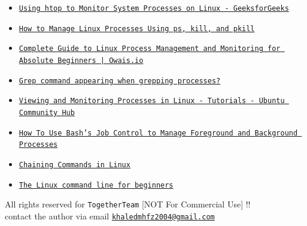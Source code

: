 \documentclass[12pt]{article}
\begin{document}
\begin{itemize}
    \item \href{https://www.geeksforgeeks.org/linux-unix/using-htop-to-monitor-system-processes-on-linux/}{\texttt{Using htop to Monitor System Processes on Linux - GeeksforGeeks}}
    \item \href{https://www.howtogeek.com/how-to-manage-linux-processes-using-ps-kill-and-pkill/}{\texttt{How to Manage Linux Processes Using ps, kill, and pkill}}
    \item \href{https://www.owais.io/blog/2025-10-06_linux-process-management-monitoring-beginners/}{\texttt{Complete Guide to Linux Process Management and Monitoring for Absolute Beginners | Owais.io}}
    \item \href{https://www.reddit.com/r/linuxquestions/comments/dneenk}{\texttt{Grep command appearing when grepping processes?}}
    \item \href{https://discourse.ubuntu.com/t/viewing-and-monitoring-processes-in-linux/26024}{\texttt{Viewing and Monitoring Processes in Linux - Tutorials - Ubuntu Community Hub}}
    \item \href{https://www.digitalocean.com/community/tutorials/how-to-use-bash-s-job-control-to-manage-foreground-and-background-processes}{\texttt{How To Use Bash's Job Control to Manage Foreground and Background Processes}}
    \item \href{https://www.geeksforgeeks.org/linux-unix/chaining-commands-in-linux/}{\texttt{Chaining Commands in Linux}}
    \item \href{https://ubuntu.com/tutorials/command-line-for-beginners}{\texttt{The Linux command line for beginners}}
\end{itemize}

\vspace{\fill}
\begin{center}
\color{muted}
All rights reserved for \texttt{TogetherTeam} [NOT For Commercial Use] !!\\
contact the author via email \href{mailto:khaledmhfz2004@gmail.com}{\texttt{khaledmhfz2004@gmail.com}}
\end{center}
\end{document}
